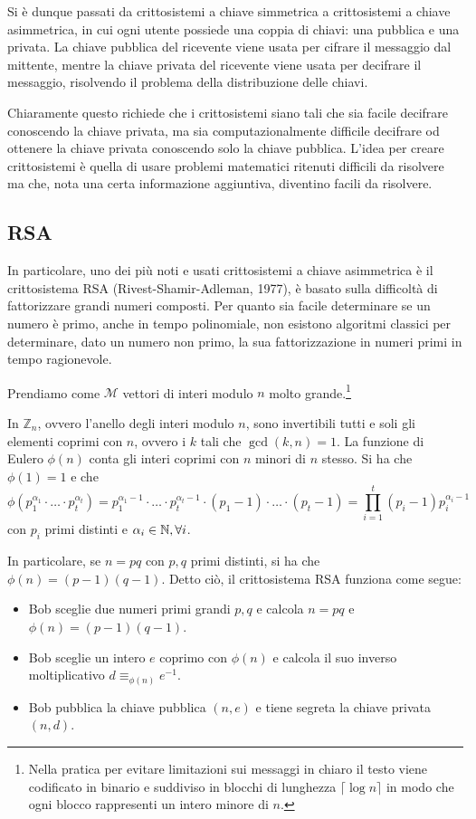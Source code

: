 Si è dunque passati da crittosistemi a chiave simmetrica a crittosistemi a chiave asimmetrica, in cui ogni utente possiede una coppia di chiavi: una pubblica e una privata.
La chiave pubblica del ricevente viene usata per cifrare il messaggio dal mittente, mentre la chiave privata del ricevente viene usata per decifrare il messaggio, risolvendo il problema della distribuzione delle chiavi.

Chiaramente questo richiede che i crittosistemi siano tali che sia facile decifrare conoscendo la chiave privata, ma sia computazionalmente difficile decifrare od ottenere la chiave privata conoscendo solo la chiave pubblica.
L'idea per creare crittosistemi è quella di usare problemi matematici ritenuti difficili da risolvere ma che, nota una certa informazione aggiuntiva, diventino facili da risolvere.

\subsection{RSA}

In particolare, uno dei più noti e usati crittosistemi a chiave asimmetrica è il crittosistema RSA (Rivest-Shamir-Adleman, 1977), è basato sulla difficoltà di fattorizzare grandi numeri composti.
Per quanto sia facile determinare se un numero è primo, anche in tempo polinomiale, non esistono algoritmi classici per determinare, dato un numero non primo, la sua fattorizzazione in numeri primi in tempo ragionevole.

Prendiamo come \(\mathcal{M}\) vettori di interi modulo \(n\) molto grande.\footnote{
  Nella pratica per evitare limitazioni sui messaggi in chiaro il testo viene codificato in binario e suddiviso in blocchi di lunghezza \(\lceil\log n \rceil\) in modo che ogni blocco rappresenti un intero minore di \(n\).
}

In \(\mathbb{Z}_n\), ovvero l'anello degli interi modulo \(n\), sono invertibili tutti e soli gli elementi coprimi con \(n\), ovvero i \(k\) tali che \(\gcd(k,n) = 1\).
La funzione di Eulero \(\phi(n)\) conta gli interi coprimi con \(n\) minori di \(n\) stesso.
Si ha che \(\phi(1) = 1\) e che 
\[\phi(p_1^{\alpha_1}\cdot\ldots\cdot p_t^{\alpha_t}) = p_1^{\alpha_1-1}\cdot\ldots \cdot p_t^{\alpha_t-1}\cdot(p_1 - 1)\cdot\ldots\cdot(p_t - 1) = \prod_{i=1}^{t} (p_i-1)p_i^{\alpha_i-1}\]
con \(p_i\) primi distinti e \(\alpha_i \in \mathbb{N},\forall i\).

In particolare, se \(n = p q\) con \(p,q\) primi distinti, si ha che \(\phi(n) = (p-1)(q-1)\).
Detto ciò, il crittosistema RSA funziona come segue:
\begin{itemize}
  \item Bob sceglie due numeri primi grandi \(p,q\) e calcola \(n = p q\) e \(\phi(n) = (p-1)(q-1)\).
  \item Bob sceglie un intero \(e\) coprimo con \(\phi(n)\) e calcola il suo inverso moltiplicativo \(d \equiv_{\phi(n)} e^{-1}\).
  \item Bob pubblica la chiave pubblica \((n,e)\) e tiene segreta la chiave privata \((n,d)\).
\end{itemize}


